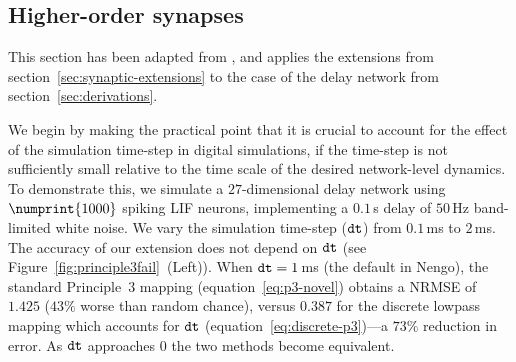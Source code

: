 

\subsection{Higher-order synapses}
\label{sec:pure_delay}

This section has been adapted from \citet{voelker2018}, and applies the extensions from section~\ref{sec:synaptic-extensions} to the case of the delay network from section~\ref{sec:derivations}.

We begin by making the practical point that it is crucial to account for the effect of the simulation time-step in digital simulations, if the time-step is not sufficiently small relative to the time scale of the desired network-level dynamics.
To demonstrate this, we simulate a $27$-dimensional delay network using $\numprint{1000}$ spiking LIF neurons, implementing a $0.1$\,s delay of $50$\,Hz band-limited white noise.
We vary the simulation time-step ($\texttt{dt}{}$) from $0.1$\,ms to $2$\,ms.
The accuracy of our extension does not depend on $\texttt{dt}{}$ (see Figure~\ref{fig:principle3fail}~(Left)).
When $\texttt{dt}{}=1$\,ms (the default in Nengo), the standard Principle~3 mapping (equation~\ref{eq:p3-novel}) obtains a NRMSE of $1.425$ ($43\%$ worse than random chance), versus $0.387$ for the discrete lowpass mapping which accounts for $\texttt{dt}{}$ (equation~\ref{eq:discrete-p3})---a $73\%$ reduction in error.
As $\texttt{dt}{}$ approaches $0$ the two methods become equivalent.

